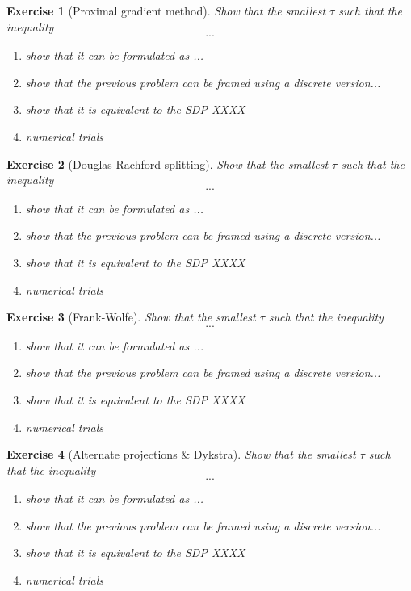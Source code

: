 \documentclass[11pt,a4paper]{article}
\newtheorem{exercise}{Exercise}
\begin{document}
	
	\begin{exercise}[Proximal gradient method]
	Show that the smallest $\tau$ such that the inequality
	\[ ... \]
	\begin{enumerate}
	\item show that it can be formulated as ...
	\item show that the previous problem can be framed using a discrete version...
	\item show that it is equivalent to the SDP XXXX
	\item numerical trials
	\end{enumerate}
	\end{exercise}
	
	
	\begin{exercise}[Douglas-Rachford splitting]
	Show that the smallest $\tau$ such that the inequality
	\[ ... \]
	\begin{enumerate}
	\item show that it can be formulated as ...
	\item show that the previous problem can be framed using a discrete version...
	\item show that it is equivalent to the SDP XXXX
	\item numerical trials
	\end{enumerate}
	\end{exercise}


	\begin{exercise}[Frank-Wolfe]
	Show that the smallest $\tau$ such that the inequality
	\[ ... \]
	\begin{enumerate}
	\item show that it can be formulated as ...
	\item show that the previous problem can be framed using a discrete version...
	\item show that it is equivalent to the SDP XXXX
	\item numerical trials
	\end{enumerate}
	\end{exercise}	
	

	\begin{exercise}[Alternate projections \& Dykstra]
	Show that the smallest $\tau$ such that the inequality
	\[ ... \]
	\begin{enumerate}
	\item show that it can be formulated as ...
	\item show that the previous problem can be framed using a discrete version...
	\item show that it is equivalent to the SDP XXXX
	\item numerical trials
	\end{enumerate}
	\end{exercise}	
	
\end{document}
